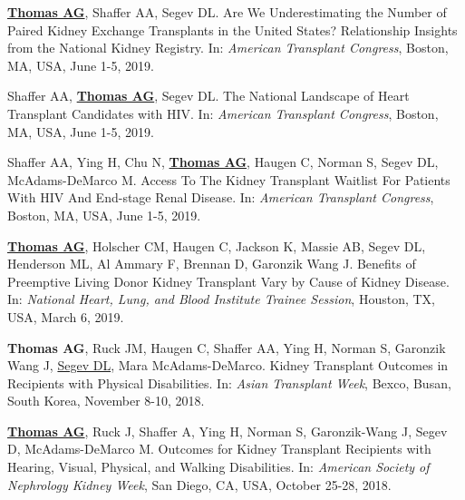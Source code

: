 \documentclass[10pt]{article}
\makeatletter
\newlength{\bibhang}
\newlength{\bibsep}
 {\@listi \global\bibsep\itemsep \global\advance\bibsep by\parsep}
\newenvironment{bibenum*}
  {\renewcommand\labelenumi{[\theenumi]}%
   \etaremune[
     topsep=0pt,
     itemsep=\bibsep,
     parsep=0pt,partopsep=0pt,
     itemindent=-\bibhang,
     leftmargin={\bibhang+\widthof{[999]}}]}
  {\endetaremune}
\makeatother
\begin{document}
\begin{bibenum*}

\item \underline{\textbf{Thomas AG}}, Shaffer AA, Segev DL.
  Are We Underestimating the Number of Paired Kidney Exchange
  Transplants in the United States? Relationship Insights
  from the National Kidney Registry.
  In: \emph{American Transplant Congress},
  Boston, MA, USA, June 1-5, 2019.

\item Shaffer AA, \underline{\textbf{Thomas AG}}, Segev DL.
  The National Landscape of Heart Transplant Candidates with HIV.
  In: \emph{American Transplant Congress},
  Boston, MA, USA, June 1-5, 2019.

\item Shaffer AA, Ying H, Chu N, \underline{\textbf{Thomas AG}},
  Haugen C, Norman S, Segev DL, McAdams-DeMarco M.
  Access To The Kidney Transplant Waitlist For Patients With HIV
  And End-stage Renal Disease.
  In: \emph{American Transplant Congress},
  Boston, MA, USA, June 1-5, 2019.

\item \underline{\textbf{Thomas AG}}, Holscher CM, Haugen C, Jackson K, Massie AB,
  Segev DL, Henderson ML, Al Ammary F, Brennan D, Garonzik Wang J.
  Benefits of Preemptive Living Donor Kidney Transplant Vary by
  Cause of Kidney Disease.
  In: \emph{National Heart, Lung, and Blood Institute Trainee Session},
  Houston, TX, USA, March 6, 2019.

\item \textbf{Thomas AG}, Ruck JM, Haugen C, Shaffer AA, Ying H,
  Norman S, Garonzik Wang J, \underline{Segev DL}, Mara McAdams-DeMarco.
  Kidney Transplant Outcomes in Recipients with Physical Disabilities.
  In: \emph{Asian Transplant Week},
  Bexco, Busan, South Korea, November 8-10, 2018.

\item \underline{\textbf{Thomas AG}}, Ruck J, Shaffer A, Ying H, Norman S,
  Garonzik-Wang J, Segev D, McAdams-DeMarco M.
  Outcomes for Kidney Transplant Recipients with Hearing, Visual, Physical,
  and Walking Disabilities.
  In: \emph{American Society of Nephrology Kidney Week},
  San Diego, CA, USA, October 25-28, 2018.



\end{bibenum*}
\end{document}
